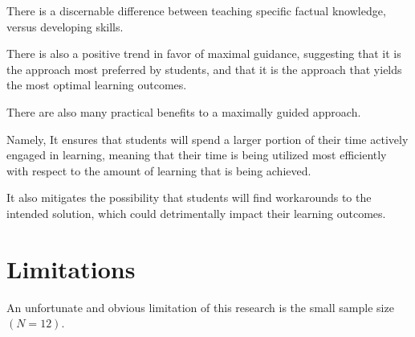 There is a discernable difference between teaching specific factual knowledge, versus developing skills. %







There is also a positive trend in favor of maximal guidance, suggesting that it is the approach most preferred by students, and that it is the approach that yields the most optimal learning outcomes. 















There are also many practical benefits to a maximally guided approach. %







Namely, It ensures that students will spend a larger portion of their time actively engaged in learning, meaning that their time is being utilized most efficiently with respect to the amount of learning that is being achieved. %







It also mitigates the possibility that students will find workarounds to the intended solution, which could detrimentally impact their learning outcomes. 























\section{Limitations}







    An unfortunate and obvious limitation of this research is the small sample size $(N=12)$. %







